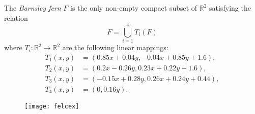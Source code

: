 \documentclass[12pt]{article}
\newcommand{\R}{\mathbb R}
\theoremstyle{remark}
\begin{document}
The \emph{Barnsley fern} $F$ is the only non-empty compact subset of $\R^2$ satisfying
the relation
\[
  F = \bigcup_{i=1}^4 T_i(F)
\]
where $T_i\colon \R^2\to \R^2$ are the following linear mappings:
\begin{align*}
T_1(x,y)&=(0.85 x + 0.04 y, -0.04 x + 0.85 y+1.6),\\
T_2(x,y)&=(0.2 x - 0.26 y, 0.23 x + 0.22 y + 1.6),\\
T_3(x,y)&=(-0.15 x +0.28 y, 0.26 x+0.24 y +0.44),\\
T_4(x,y)&=(0,0.16 y).
\end{align*}
\begin{figure}
\texttt{[image: felcex]}
\end{figure}
\end{document}
